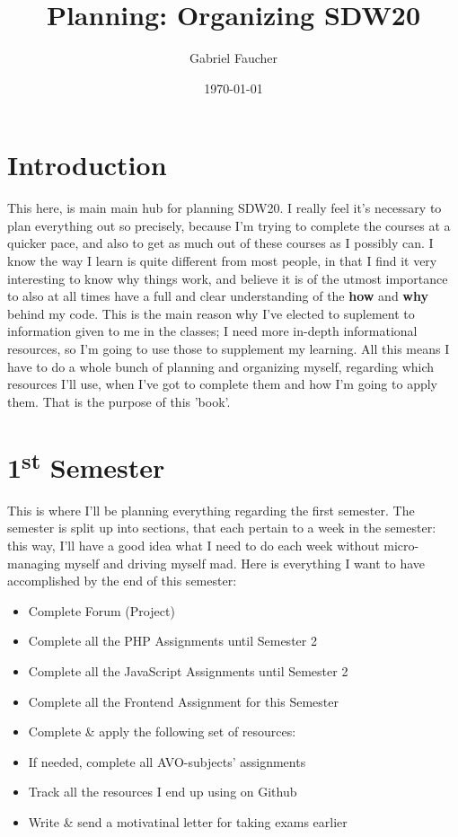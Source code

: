 \documentclass[12pt]{book}
\title{Planning: Organizing SDW20}
\author{Gabriel Faucher}
\date{\today}
\begin{document}
\maketitle

\tableofcontents

\chapter{Introduction}
This here, is main main hub for planning SDW20.
I really feel it's necessary to plan everything out so precisely,
because I'm trying to complete the courses at a quicker pace, and also
to get as much out of these courses as I possibly can. I know the way I learn
is quite different from most people, in that I find it very interesting to 
know why things work, and believe it is of the utmost importance to also 
at all times have a full and clear understanding of the \textbf{how} and
\textbf{why} behind my code. This is the main reason why I've elected to 
suplement to information given to me in the classes; I need more in-depth
informational resources, so I'm going to use those to supplement my learning.
All this means I have to do a whole bunch of planning and organizing myself,
regarding which resources I'll use, when I've got to complete them and how
I'm going to apply them. That is the purpose of this 'book'.

\chapter{1\textsuperscript{st} Semester}
This is where I'll be planning everything regarding the first semester.
The semester is split up into sections, that each pertain to a week in 
the semester: this way, I'll have a good idea what I need to do each week 
without micro-managing myself and driving myself mad.
Here is everything I want to have accomplished by the end of this semester:

\begin{itemize}
  \item Complete Forum (Project)
  \item Complete all the PHP Assignments until Semester 2
  \item Complete all the JavaScript Assignments until Semester 2
  \item Complete all the Frontend Assignment for this Semester
  \item Complete \& apply the following set of resources:
  \item If needed, complete all AVO-subjects' assignments
  \item Track all the resources I end up using on Github
  \item Write \& send a motivatinal letter for taking exams earlier
\end{itemize}
\end{document}

